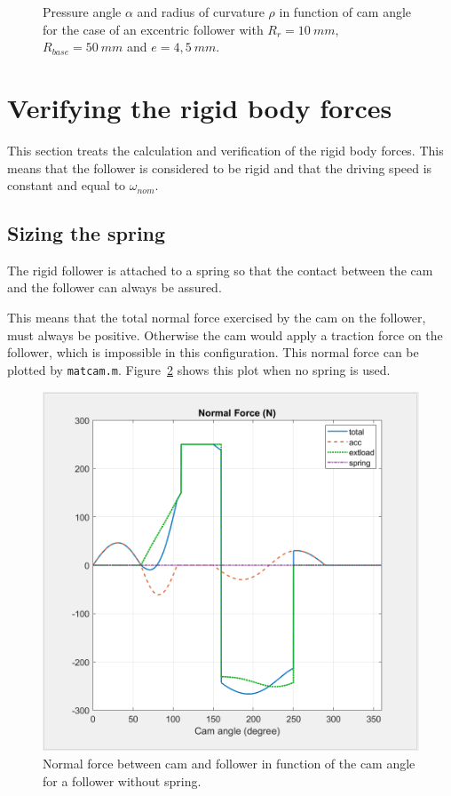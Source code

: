 \documentclass[a4paper]{article}
\begin{document}
\begin{figure}
	\caption{Pressure angle \(\alpha\) and radius of curvature \(\rho\) in function of cam angle for the case of an excentric follower with \(R_r=10~mm\), \(R_{base}=50~mm\) and \(e=4,5~mm\).}
	\label{fig:geomet}
	
\end{figure}

\section{Verifying the rigid body forces}

This section treats the calculation and verification of the rigid body forces. This means that the follower is considered to be rigid and that the driving speed is constant and equal to \(\omega_{nom}\).

\subsection{Sizing the spring}

The rigid follower is attached to a spring so that the contact between the cam and the follower can always be assured.

This means that the total normal force exercised by the cam on the follower, must always be positive. Otherwise the cam would apply a traction force on the follower, which is impossible in this configuration. This normal force can be plotted by \texttt{matcam.m}. Figure~\ref{fig:Nzonderveer} shows this plot when no spring is used. 

\begin{figure}
	\centering
	\includegraphics[width=.7\textwidth]{Nzonderveer.png}
	\caption{Normal force between cam and follower in function of the cam angle for a follower without spring.}
	\label{fig:Nzonderveer}
\end{figure}
\end{document}
